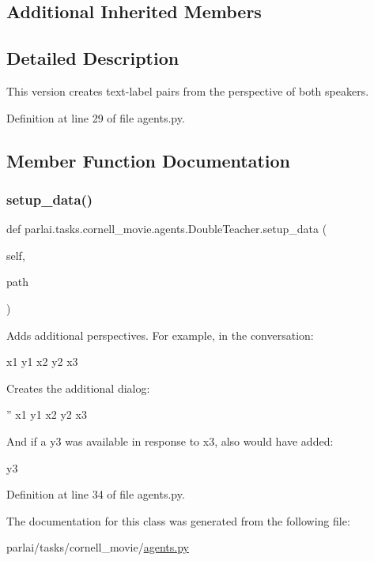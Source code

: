 \subsection*{Additional Inherited Members}


\subsection{Detailed Description}
\begin{DoxyVerb}This version creates text-label pairs from the perspective of both
speakers.
\end{DoxyVerb}
 

Definition at line 29 of file agents.\+py.



\subsection{Member Function Documentation}
\mbox{\label{classparlai_1_1tasks_1_1cornell__movie_1_1agents_1_1DoubleTeacher_a329e24270a27f4c7d5b56d2b9c2aed8b}} 
\subsubsection{\texorpdfstring{setup\+\_\+data()}{setup\_data()}}
{\footnotesize\ttfamily def parlai.\+tasks.\+cornell\+\_\+movie.\+agents.\+Double\+Teacher.\+setup\+\_\+data (\begin{DoxyParamCaption}\item[{}]{self,  }\item[{}]{path }\end{DoxyParamCaption})}

\begin{DoxyVerb}Adds additional perspectives.
For example, in the conversation:

x1 y1
x2 y2
x3

Creates the additional dialog:

'' x1
y1 x2
y2 x3

And if a y3 was available in response to x3, also would have added:

y3
\end{DoxyVerb}
 

Definition at line 34 of file agents.\+py.



The documentation for this class was generated from the following file\+:\begin{DoxyCompactItemize}
\item 
parlai/tasks/cornell\+\_\+movie/\hyperlink{parlai_2tasks_2cornell__movie_2agents_8py}{agents.\+py}\end{DoxyCompactItemize}
